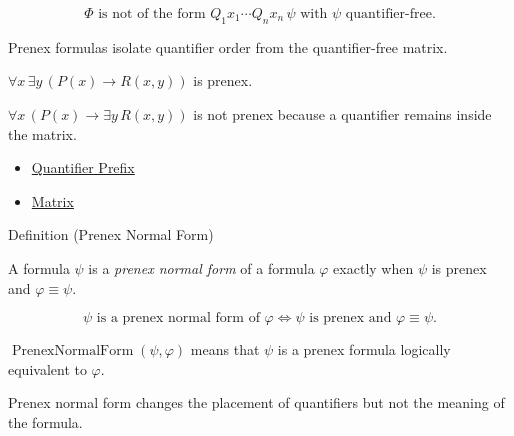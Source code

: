 \begin{remark*}
\[
\Phi \text{ is not of the form } Q_1x_1\cdots Q_nx_n\,\psi
\text{ with } \psi \text{ quantifier-free.}
\]
\end{remark*}

\begin{remark*}[Interpretation]
Prenex formulas isolate quantifier order from the quantifier-free matrix.
\end{remark*}

\begin{remark*}[Examples]
\(\forall x\,\exists y\,(P(x)\to R(x,y))\) is prenex.
\end{remark*}

\begin{remark*}
\(\forall x\,(P(x)\to\exists y\,R(x,y))\) is not prenex because a quantifier
remains inside the matrix.
\end{remark*}

\begin{dependencies}
\begin{itemize}
  \item \hyperref[def:quantifier-prefix]{Quantifier Prefix}
  \item \hyperref[def:matrix-prenex]{Matrix}
\end{itemize}
\end{dependencies}

\begin{definitionbox}{Definition (Prenex Normal Form)}
\begin{definition}
\label{def:pnf}
A formula \(\psi\) is a \emph{prenex normal form} of a formula \(\varphi\)
exactly when \(\psi\) is prenex and \(\varphi\equiv\psi\).
\end{definition}
\end{definitionbox}

\begin{remark*}
\[
\psi \text{ is a prenex normal form of } \varphi
\Longleftrightarrow
\psi \text{ is prenex}
\text{ and }
\varphi\equiv\psi.
\]
\end{remark*}

\begin{remark*}
\(\operatorname{PrenexNormalForm}(\psi,\varphi)\) means that \(\psi\) is a
prenex formula logically equivalent to \(\varphi\).
\end{remark*}

\begin{remark*}[Interpretation]
Prenex normal form changes the placement of quantifiers but not the meaning of
the formula.
\end{remark*}

